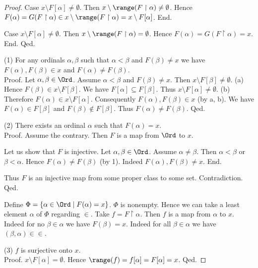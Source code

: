 \documentclass[../set-theory.tex]{subfiles}
\begin{document}
\begin{forthel}
\begin{proof}
        Case $x \setminus F[\alpha] \neq \emptyset$.
          Then $x \setminus \range(F \restriction \alpha) \neq \emptyset$.
          Hence $F(\alpha)
            = G(F \restriction \alpha)
            \in x \setminus \range(F \restriction \alpha)
            = x \setminus F[\alpha]$.
        End.

        Case $x \setminus F[\alpha] \neq \emptyset$.
          Then $x \setminus \range(F \restriction \alpha) = \emptyset$.
          Hence $F(\alpha)
            = G(F \restriction \alpha)
            = x$.
        End.
      Qed.

      (1) For any ordinals $\alpha, \beta$ such that $\alpha < \beta$ and
      $F(\beta) \neq x$ we have $F(\alpha), F(\beta) \in x$ and $F(\alpha) \neq
      F(\beta)$. \\
      Proof.
        Let $\alpha, \beta \in \Ord$.
        Assume $\alpha < \beta$ and $F(\beta) \neq x$.
        Then $x \setminus F[\beta] \neq \emptyset$.
        (a) Hence $F(\beta) \in x \setminus F[\beta]$.
        We have $F[\alpha] \subseteq F[\beta]$.
        Thus $x \setminus F[\alpha] \neq \emptyset$.
        (b) Therefore $F(\alpha) \in x \setminus F[\alpha]$.
        Consequently $F(\alpha), F(\beta) \in x$ (by a, b).
        We have $F(\alpha) \in F[\beta]$ and $F(\beta) \notin F[\beta]$.
        Thus $F(\alpha) \neq F(\beta)$.
      Qed.

      (2) There exists an ordinal $\alpha$ such that $F(\alpha) = x$. \\
      Proof.
        Assume the contrary.
        Then $F$ is a map from $\Ord$ to $x$.

        Let us show that $F$ is injective.
          Let $\alpha, \beta \in \Ord$.
          Assume $\alpha \neq \beta$.
          Then $\alpha < \beta$ or $\beta < \alpha$.
          Hence $F(\alpha) \neq F(\beta)$ (by 1).
          Indeed $F(\alpha), F(\beta) \neq x$.
        End.

        Thus $F$ is an injective map from some proper class to some set.
        Contradiction.
      Qed.

      Define $\Phi = \{ \alpha \in \Ord \mid F(\alpha) = x \}$.
      $\Phi$ is nonempty.
      Hence we can take a least element $\alpha$ of $\Phi$ regarding ${\in}$.
      Take $f = F \restriction \alpha$.
      Then $f$ is a map from $\alpha$ to $x$.
      Indeed for no $\beta \in \alpha$ we have $F(\beta) = x$.
      Indeed for all $\beta \in \alpha$ we have $(\beta, \alpha) \in {\in}$.

      (3) $f$ is surjective onto $x$. \\
      Proof.
        $x \setminus F[\alpha] = \emptyset$.
        Hence $\range(f)
          = f[\alpha]
          = F[\alpha]
          = x$.
      Qed.


\end{proof}
\end{forthel}
\end{document}
